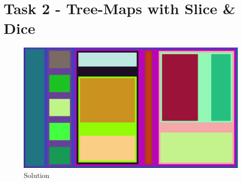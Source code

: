 \documentclass[a4paper]{article}
\begin{document}
\section*{Task 2 - Tree-Maps with Slice \& Dice}
\begin{figure}[!ht]
	\centering
	\includegraphics[width=0.9\linewidth]{5_2}
	\caption{Solution}
\end{figure}
\end{document}
